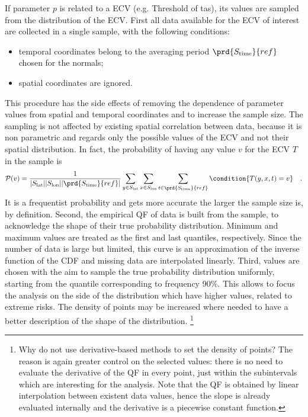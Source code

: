 If parameter $p$ is related to a \gls{ECV} (e.g. {Threshold of \gls{tas}}), its values are sampled from the distribution of the \gls{ECV}. First all data available for the \gls{ECV} of interest are collected in a single sample, with the following conditions:
\begin{itemize}
  \item temporal coordinates belong to the averaging period $\prd{S_\text{time}}{ref}$ chosen for the \glspl{normal};
  \item spatial coordinates are ignored.
\end{itemize}
This procedure has the side effects of removing the dependence of parameter values from spatial and temporal coordinates and to increase the sample size. The sampling is not affected by existing spatial correlation between data, because it is non parametric and regards only the possible values of the \gls{ECV} and not their spatial distribution. In fact, the probability of having any value $v$ for the \gls{ECV} $T$ in the sample is
\begin{equation}
  \label{eq:variable_probability}
  \mathcal{P}(v) = \frac{1}{\abs{S_\text{lat}} \abs{S_\text{lon}} \abs{\prd{S_\text{time}}{ref}}} \sum_{y \in S_\text{lat}} \sum_{x \in S_\text{lon}} \sum_{t \in \prd{S_\text{time}}{ref}} \condition{T(y, x, t) = v}
  \quad .
\end{equation}
It is a frequentist probability and gets more accurate the larger the sample size is, by definition. %
Second, the empirical \gls{QF} of data is built from the sample, to acknowledge the shape of their true probability distribution. Minimum and maximum values are treated as the first and last quantiles, respectively. Since the number of data is large but limited, this curve is an approximation of the inverse function of the \gls{CDF} and missing data are interpolated linearly.
Third, values are chosen with the aim to sample the true probability distribution uniformly, starting from the quantile corresponding to frequency 90\%. This allows to focus the analysis on the side of the distribution which have higher values, related to extreme \glspl{risk}. The density of points may be increased where needed to have a better description of the shape of the distribution.%
\footnote{Why do not use derivative-based methods to set the density of points? The reason is again greater control on the selected values: there is no need to evaluate the derivative of the \gls{QF} in every point, just within the subintervals which are interesting for the analysis. Note that the \gls{QF} is obtained by linear interpolation between existent data values, hence the slope is already evaluated internally and the derivative is a piecewise constant function.}

